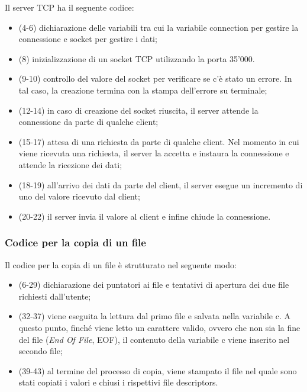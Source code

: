 \documentclass[a4paper]{article}
\begin{document}
	Il server TCP ha il seguente codice:
	
	\begin{itemize}
		\item (4-6) dichiarazione delle variabili tra cui la variabile \textsf{connection} per gestire la connessione e \textsf{socket} per gestire i dati;
		
		\item (8) inizializzazione di un socket TCP utilizzando la porta 35'000.
		
		\item (9-10) controllo del valore del socket per verificare se c'è stato un errore. In tal caso, la creazione termina con la stampa dell'errore su terminale;
		
		\item (12-14) in caso di creazione del socket riuscita, il server attende la connessione da parte di qualche client;
		
		\item (15-17) attesa di una richiesta da parte di qualche client. Nel momento in cui viene ricevuta una richiesta, il server la accetta e instaura la connessione e attende la ricezione dei dati;
		
		\item (18-19) all'arrivo dei dati da parte del client, il server esegue un incremento di uno del valore ricevuto dal client;
		
		\item (20-22) il server invia il valore al client e infine chiude la connessione.
	\end{itemize}\newpage

	\subsubsection{Codice per la copia di un file}
	
	Il codice per la copia di un file è strutturato nel seguente modo:
	
	\begin{itemize}
		\item (6-29) dichiarazione dei puntatori ai file e tentativi di apertura dei due file richiesti dall'utente;
		
		\item (32-37) viene eseguita la lettura dal primo file e salvata nella variabile \textsf{c}. A questo punto, finché viene letto un carattere valido, ovvero che non sia la fine del file (\emph{End Of File}, EOF), il contenuto della variabile \textsf{c} viene inserito nel secondo file;

		\item (39-43) al termine del processo di copia, viene stampato il file nel quale sono stati copiati i valori e chiusi i rispettivi file descriptors.
	\end{itemize}\newpage
	
\end{document}
